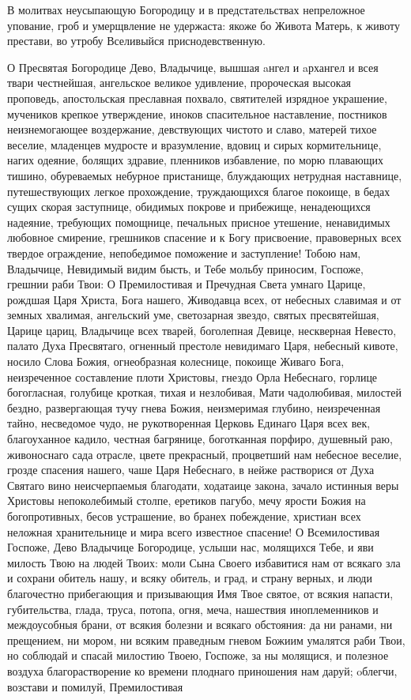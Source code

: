 

В молитвах неусыпающую Богородицу и в предстательствах непреложное упование, гроб и умерщвление не удержаста: якоже бо Живота Матерь, к животу престави, во утробу Вселивыйся приснодевственную.




О Пресвятая Богородице Дево, Владычице, вышшая aнгел и aрхангел и всея твари честнейшая, ангельское великое удивление, пророческая высокая проповедь, апостольская преславная похвало, святителей изрядное украшение, мучеников крепкое утверждение, иноков спасительное наставление, постников неизнемогающее воздержание, девствующих чистото и славо, матерей тихое веселие, младенцев мудросте и вразумление, вдовиц и сирых кормительнице, нагих одеяние, болящих здравие, пленников избавление, по морю плавающих тишино, обуреваемых небурное пристанище, блуждающих нетрудная наставнице, путешествующих легкое прохождение, труждающихся благое покоище, в бедах сущих скорая заступнице, обидимых покрове и прибежище, ненадеющихся надеяние, требующих помощнице, печальных присное утешение, ненавидимых любовное смирение, грешников спасение и к Богу присвоение, правоверных всех твердое ограждение, непобедимое поможение и заступление! Тобою нам, Владычице, Невидимый видим бысть, и Тебе мольбу приносим, Госпоже, грешнии раби Твои: О Премилостивая и Пречудная Света умнаго Царице, рождшая Царя Христа, Бога нашего, Живодавца всех, от небесных славимая и от земных хвалимая, ангельский уме, светозарная звездо, святых пресвятейшая, Царице цариц, Владычице всех тварей, боголепная Девице, нескверная Невесто, палато Духа Пресвятаго, огненный престоле невидимаго Царя, небесный кивоте, носило Слова Божия, огнеобразная колеснице, покоище Живаго Бога, неизреченное составление плоти Христовы, гнездо Орла Небеснаго, горлице богогласная, голубице кроткая, тихая и незлобивая, Мати чадолюбивая, милостей бездно, развергающая тучу гнева Божия, неизмеримая глубино, неизреченная тайно, несведомое чудо, не рукотворенная Церковь Единаго Царя всех век, благоуханное кадило, честная багрянице, боготканная порфиро, душевный раю, живоноснаго сада отрасле, цвете прекрасный, процветший нам небесное веселие, грозде спасения нашего, чаше Царя Небеснаго, в нейже растворися от Духа Святаго вино неисчерпаемыя благодати, ходатаице закона, зачало истинныя веры Христовы непоколебимый столпе, еретиков пагубо, мечу ярости Божия на богопротивных, бесов устрашение, во бранех побеждение, христиан всех неложная хранительнице и мира всего известное спасение! О Всемилостивая Госпоже, Дево Владычице Богородице, услыши нас, молящихся Тебе, и яви милость Твою на людей Твоих: моли Сына Своего избавитися нам от всякаго зла и сохрани обитель нашу, и всяку обитель, и град, и страну верных, и люди благочестно прибегающия и призывающия Имя Твое святое, от всякия напасти, губительства, глада, труса, потопа, огня, меча, нашествия иноплеменников и междоусобныя брани, от всякия болезни и всякаго обстояния: да ни ранами, ни прещением, ни мором, ни всяким праведным гневом Божиим умалятся раби Твои, но соблюдай и спасай милостию Твоею, Госпоже, за ны молящися, и полезное воздуха благорастворение ко времени плоднаго приношения нам даруй; oблегчи, возстави и помилуй, Премилостивая 